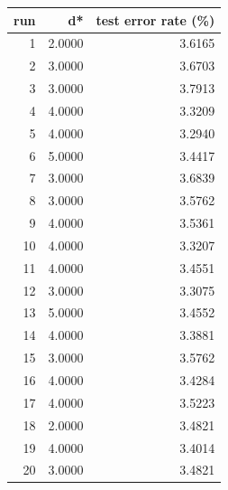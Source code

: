\begin{tabular}{rrr}
\toprule
run & d* & test error rate (\%) \\
\midrule
1 & 2.0000 & 3.6165 \\
2 & 3.0000 & 3.6703 \\
3 & 3.0000 & 3.7913 \\
4 & 4.0000 & 3.3209 \\
5 & 4.0000 & 3.2940 \\
6 & 5.0000 & 3.4417 \\
7 & 3.0000 & 3.6839 \\
8 & 3.0000 & 3.5762 \\
9 & 4.0000 & 3.5361 \\
10 & 4.0000 & 3.3207 \\
11 & 4.0000 & 3.4551 \\
12 & 3.0000 & 3.3075 \\
13 & 5.0000 & 3.4552 \\
14 & 4.0000 & 3.3881 \\
15 & 3.0000 & 3.5762 \\
16 & 4.0000 & 3.4284 \\
17 & 4.0000 & 3.5223 \\
18 & 2.0000 & 3.4821 \\
19 & 4.0000 & 3.4014 \\
20 & 3.0000 & 3.4821 \\
\bottomrule
\end{tabular}
